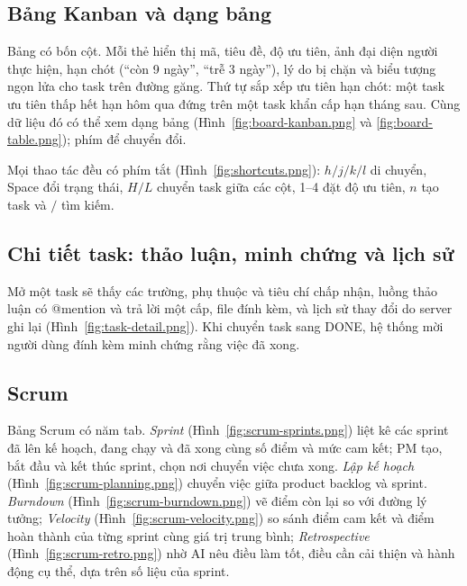 \documentclass[../main.tex]{subfiles}
\begin{document}

\subsection{Bảng Kanban và dạng bảng}
Bảng có bốn cột. Mỗi thẻ hiển thị mã, tiêu đề, độ ưu tiên, ảnh đại diện người thực hiện, hạn chót
(``còn 9 ngày'', ``trễ 3 ngày''), lý do bị chặn và biểu tượng ngọn lửa cho task trên đường găng. Thứ
tự sắp xếp ưu tiên hạn chót: một task ưu tiên thấp hết hạn hôm qua đứng trên một task khẩn cấp hạn
tháng sau. Cùng dữ liệu đó có thể xem dạng bảng (Hình~\ref{fig:board-kanban.png} và
\ref{fig:board-table.png}); phím  để chuyển đổi.


Mọi thao tác đều có phím tắt (Hình~\ref{fig:shortcuts.png}): $h/j/k/l$ di chuyển, Space đổi trạng
thái, $H/L$ chuyển task giữa các cột, 1--4 đặt độ ưu tiên, $n$ tạo task và $/$ tìm kiếm.


\subsection{Chi tiết task: thảo luận, minh chứng và lịch sử}
Mở một task sẽ thấy các trường, phụ thuộc và tiêu chí chấp nhận, luồng thảo luận có @mention và trả
lời một cấp, file đính kèm, và lịch sử thay đổi do server ghi lại (Hình~\ref{fig:task-detail.png}).
Khi chuyển task sang DONE, hệ thống mời người dùng đính kèm minh chứng rằng việc đã xong.


\subsection{Scrum}
Bảng Scrum có năm tab. \emph{Sprint} (Hình~\ref{fig:scrum-sprints.png}) liệt kê các sprint đã lên
kế hoạch, đang chạy và đã xong cùng số điểm và mức cam kết; PM tạo, bắt đầu và kết thúc sprint, chọn
nơi chuyển việc chưa xong. \emph{Lập kế hoạch} (Hình~\ref{fig:scrum-planning.png}) chuyển việc giữa
product backlog và sprint. \emph{Burndown} (Hình~\ref{fig:scrum-burndown.png}) vẽ điểm còn lại so với
đường lý tưởng; \emph{Velocity} (Hình~\ref{fig:scrum-velocity.png}) so sánh điểm cam kết và điểm hoàn
thành của từng sprint cùng giá trị trung bình; \emph{Retrospective}
(Hình~\ref{fig:scrum-retro.png}) nhờ AI nêu điều làm tốt, điều cần cải thiện và hành động cụ thể, dựa
trên số liệu của sprint.
\end{document}
